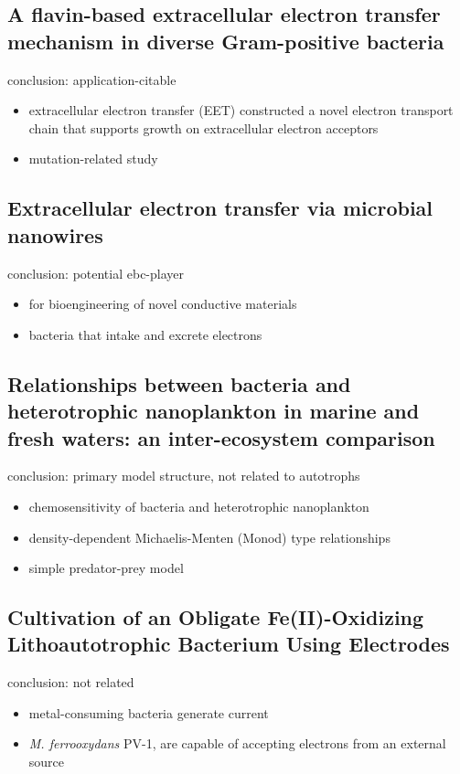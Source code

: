 \documentclass[a4paper,11pt]{article}
\begin{document}
    \subsection{A flavin-based extracellular electron transfer mechanism in diverse Gram-positive bacteria\autocite{light2018flavin}}
    conclusion: application-citable
    \begin{itemize}
        \item extracellular electron transfer (EET) constructed a novel electron transport chain that supports growth on extracellular electron acceptors
        \item mutation-related study
    \end{itemize}
    
    \subsection{Extracellular electron transfer via microbial nanowires\autocite{reguera2005extracellular}}
    conclusion: potential ebc-player
    \begin{itemize}
        \item for bioengineering of novel conductive materials
        \item bacteria that intake and excrete electrons
    \end{itemize}
    
    \subsection{Relationships between bacteria and heterotrophic nanoplankton in marine and fresh waters: an inter-ecosystem comparison\autocite{sanders1992relationships}}
    conclusion: primary model structure, not related to autotrophs
    \begin{itemize}
        \item chemosensitivity of bacteria and heterotrophic nanoplankton
        \item density-dependent Michaelis-Menten (Monod) type relationships
        \item simple predator-prey model
    \end{itemize}
    
    \subsection{Cultivation of an Obligate Fe(II)-Oxidizing Lithoautotrophic Bacterium Using Electrodes\autocite{summers2013cultivation}}
    conclusion: not related
    \begin{itemize}
        \item metal-consuming bacteria generate current
        \item \textit{M. ferrooxydans} PV-1, are capable of accepting electrons from an external source
    \end{itemize}
    
\end{document}
